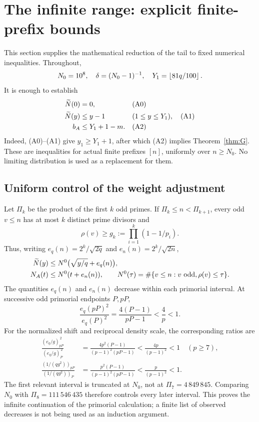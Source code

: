 \section{The infinite range: explicit finite-prefix bounds}\label{sec:analytic}
This section supplies the mathematical reduction of the tail to fixed numerical inequalities. Throughout,
\[
 N_0=10^8,\quad \delta=(N_0-1)^{-1},\quad
 Y_1=\left\lfloor81q/100\right\rfloor.
\]
It is enough to establish
\begin{align}
 \widetilde N(0)&=0, &&\text{(A0)}\label{eq:A0}\\
 \widetilde N(y)&\le y-1 &&(1\le y\le Y_1),\quad\text{(A1)}\label{eq:A1}\\
 b_A&\le Y_1+1-m. &&\text{(A2)}\label{eq:A2}
\end{align}
Indeed, (A0)--(A1) give $y_1\ge Y_1+1$, after which (A2) implies Theorem~\ref{thm:G}. These are inequalities for actual finite prefixes $[n]$, uniformly over $n\ge N_0$. No limiting distribution is used as a replacement for them.

\subsection{Uniform control of the weight adjustment}
Let $\Pi_k$ be the product of the first $k$ odd primes. If $\Pi_k\le n<\Pi_{k+1}$, every odd $v\le n$ has at most $k$ distinct prime divisors and
\[
 \rho(v)\ge g_k:=\prod_{i=1}^k(1-1/p_i).
\]
Thus, writing $e_q(n)=2^k/\sqrt{2q}$ and $e_n(n)=2^k/\sqrt{2n}$,
\begin{align}
 \widetilde N(y)&\le N^0\bigl(\sqrt{y/q}+e_q(n)\bigr),\\
 N_A(t)&\le N^0(t+e_n(n)),
 \qquad N^0(\tau)=\#\{v\le n:v\text{ odd},\rho(v)\le\tau\}.
\end{align}
The quantities $e_q(n)$ and $e_n(n)$ decrease within each primorial interval. At successive odd primorial endpoints $P,pP$,
\[
 \frac{e_q(pP)^2}{e_q(P)^2}=\frac{4(P-1)}{pP-1}<\frac4p<1.
\]
For the normalized shift and reciprocal density scale, the corresponding ratios are
\begin{align}
 \frac{(e_q/g)_{pP}^{\,2}}{(e_q/g)_{P}^{\,2}}
 &=\frac{4p^2(P-1)}{(p-1)^2(pP-1)}<\frac{4p}{(p-1)^2}<1\quad(p\ge7),\\
 \frac{(1/(qg^2))_{pP}}{(1/(qg^2))_{P}}
 &=\frac{p^2(P-1)}{(p-1)^2(pP-1)}<\frac{p}{(p-1)^2}<1.
\end{align}
The first relevant interval is truncated at $N_0$, not at $\Pi_7=4\,849\,845$. Comparing $N_0$ with $\Pi_8=111\,546\,435$ therefore controls every later interval. This proves the infinite continuation of the primorial calculation; a finite list of observed decreases is not being used as an induction argument.

